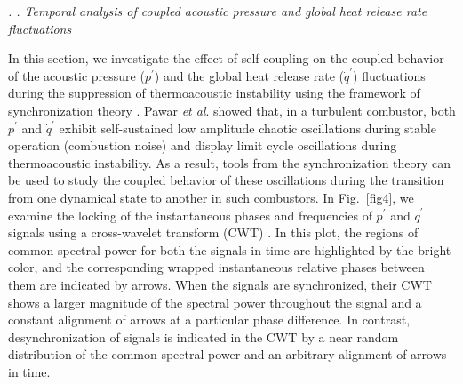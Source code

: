 \documentclass[twocolumn,10pt]{article} %
\renewcommand{\subsection}%
              [1]%
              {%
               \bgroup%
               \flushleft%
               \small\em%
               \stepcounter{subsection}%
               \arabic{section}.%
               \arabic{subsection}. #1%
               \par%
               \egroup%
              }%
\begin{document}
\subsection{Temporal analysis of coupled acoustic pressure and global heat release rate fluctuations}

In this section, we investigate the effect of self-coupling on the coupled behavior of the acoustic pressure ($p^{\prime}$) and the global heat release rate ($\dot{q}^{\prime}$) fluctuations during the suppression of thermoacoustic instability using the framework of synchronization theory \cite{pikovsky2003synchronization}. Pawar \textit{et al}. \cite{pawar2017thermoacoustic} showed that, in a turbulent combustor, both $p^{\prime}$ and $\dot{q}^{\prime}$ exhibit self-sustained low amplitude chaotic oscillations during stable operation (combustion noise) and display limit cycle oscillations during thermoacoustic instability. As a result, tools from the synchronization theory can be used to study the coupled behavior of these oscillations during the transition from one dynamical state to another in such combustors. In Fig.~\ref{fig4}, we examine the locking of the instantaneous phases and frequencies of $p^{\prime}$ and $\dot{q}^{\prime}$ signals using a cross-wavelet transform (CWT) \cite{grinsted2004application, pawar2019temporal}. In this plot, the regions of common spectral power for both the signals in time are highlighted by the bright color, and the corresponding wrapped instantaneous relative phases between them are indicated by arrows. When the signals are synchronized, their CWT shows a larger magnitude of the spectral power throughout the signal and a constant alignment of arrows at a particular phase difference. In contrast, desynchronization of signals is indicated in the CWT by a near random distribution of the common spectral power and an arbitrary alignment of arrows in time.
\end{document}
